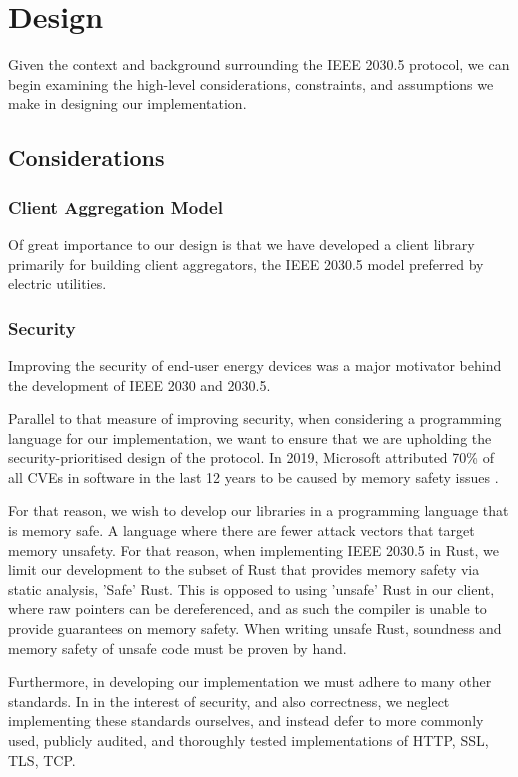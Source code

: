 \chapter{Design}\label{ch:design}
Given the context and background surrounding the IEEE 2030.5 protocol, we can begin examining the high-level considerations, constraints, and assumptions we make in designing our implementation.

\section{Considerations}

\subsection{Client Aggregation Model}
Of great importance to our design is that we have developed a client library primarily for building client aggregators, the IEEE 2030.5 model preferred by electric utilities.

\subsection{Security}
Improving the security of end-user energy devices was a major motivator behind the development of IEEE 2030 and 2030.5. 

Parallel to that measure of improving security, when considering a programming language for our implementation, we want to ensure that we are upholding the security-prioritised design of the protocol. In 2019, Microsoft attributed 70\% of all CVEs in software in the last 12 years to be caused by memory safety issues \cite[]{SecurityMemorySafety}. 

For that reason, we wish to develop our libraries in a programming language that is memory safe. A language where there are fewer attack vectors that target memory unsafety. For that reason, when implementing IEEE 2030.5 in Rust, we limit our development to the subset of Rust that provides memory safety via static analysis, 'Safe' Rust. This is opposed to using 'unsafe' Rust in our client, where raw pointers can be dereferenced, and as such the compiler is unable to provide guarantees on memory safety. When writing unsafe Rust, soundness and memory safety of unsafe code must be proven by hand.

Furthermore, in developing our implementation we must adhere to many other standards. In in the interest of security, and also correctness, we neglect implementing these standards ourselves, and instead defer to more commonly used, publicly audited, and thoroughly tested implementations of HTTP, SSL, TLS, TCP. 


